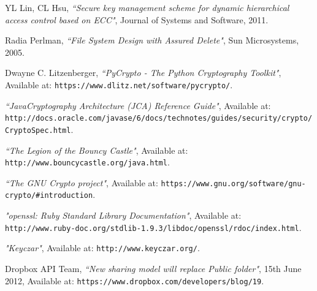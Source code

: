 \documentclass[10pt, titlepage]{article}
\begin{document}
\begin{thebibliography}{10}
YL Lin, CL Hsu, \emph{``Secure key management scheme for dynamic hierarchical access control based on ECC"}, Journal of Systems and Software, 2011.

Radia Perlman, \emph{``File System Design with Assured Delete"}, Sun Microsystems, 2005.

Dwayne C. Litzenberger, \emph{``PyCrypto - The Python Cryptography Toolkit"},
Available at: \texttt{https://www.dlitz.net/software/pycrypto/}.

\emph{``Java\texttrademark Cryptography Architecture (JCA) Reference Guide"},
Available at: \texttt{http://docs.oracle.com/javase/6/docs/technotes/guides/security/crypto/CryptoSpec.html}.

\emph{``The Legion of the Bouncy Castle"},
Available at: \texttt{http://www.bouncycastle.org/java.html}.

\emph{``The GNU Crypto project"},
Available at: \texttt{https://www.gnu.org/software/gnu-crypto/\#introduction}.

\emph{"openssl: Ruby Standard Library Documentation"},
Available at: \texttt{http://www.ruby-doc.org/stdlib-1.9.3/libdoc/openssl/rdoc/index.html}.

\emph{"Keyczar"}, Available at: \texttt{http://www.keyczar.org/}.

Dropbox API Team, \emph{``New sharing model will replace Public folder"},  15th June 2012,
Available at: \texttt{https://www.dropbox.com/developers/blog/19}.

\end{thebibliography}
\end{document}
